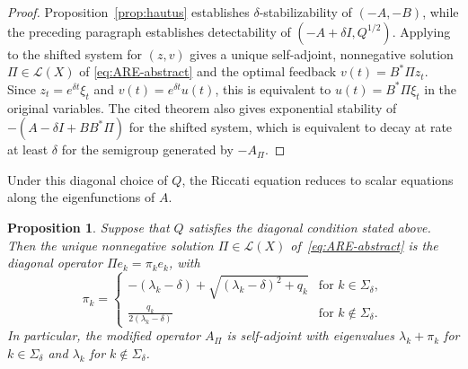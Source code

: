\documentclass[11pt]{article}
\numberwithin{equation}{section}
\newtheorem{proposition}[theorem]{Proposition}
\theoremstyle{definition}
\begin{document}
\begin{proof}
    Proposition~\ref{prop:hautus} establishes $\delta$-stabilizability of $(-A,-B)$, while the preceding paragraph establishes detectability of $(-A+\delta I, Q^{1/2})$.
    Applying~\cite[Thm.~6.2.7]{CurtainZwart1995} to the shifted system for $(z,v)$ gives a unique self-adjoint, nonnegative solution $\Pi \in \mathcal{L}(X)$ of \eqref{eq:ARE-abstract} and the optimal feedback $v(t) = B^*\Pi z_t$.
    Since $z_t = e^{\delta t}\xi_t$ and $v(t) = e^{\delta t}u(t)$, this is equivalent to $u(t) = B^*\Pi\xi_t$ in the original variables.
    The cited theorem also gives exponential stability of $-(A-\delta I + BB^*\Pi)$ for the shifted system, which is equivalent to decay at rate at least $\delta$ for the semigroup generated by $-A_\Pi$.
\end{proof}

Under this diagonal choice of $Q$, the Riccati equation reduces to scalar equations along the eigenfunctions of $A$.

\begin{proposition}
\label{prop:are_diagonal}
    Suppose that $Q$ satisfies the diagonal condition stated above.
    Then the unique nonnegative solution $\Pi \in \mathcal{L}(X)$ of~\eqref{eq:ARE-abstract} is the diagonal operator $\Pi e_k = \pi_k e_k$, with
    \begin{equation}
        \label{eq:pi_k_definition}
        \pi_k =
        \begin{cases}
            -(\lambda_k-\delta) + \sqrt{(\lambda_k-\delta)^2 + q_k} & \text{for } k\in\Sigma_\delta, \\[1ex]
            \displaystyle \frac{q_k}{2(\lambda_k-\delta)} & \text{for } k\notin\Sigma_\delta.
        \end{cases}
    \end{equation}
    In particular, the modified operator $A_\Pi$ is self-adjoint with eigenvalues $\lambda_k + \pi_k$ for $k \in \Sigma_\delta$ and $\lambda_k$ for $k \notin \Sigma_\delta$.
\end{proposition}
\end{document}
